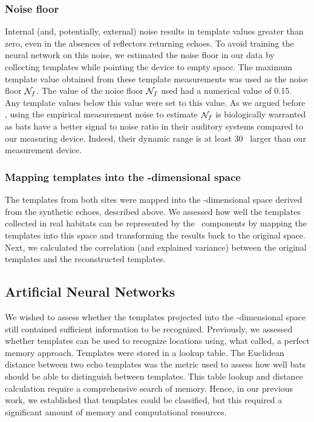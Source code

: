 \documentclass[preprint,5p]{elsarticle}
\begin{document}
\subsubsection{Noise floor}

Internal (and, potentially, external) noise results in template values greater than zero, even in the absences of reflectors returning echoes. To avoid training the neural network on this noise, we estimated the noise floor in our data by collecting templates while pointing the device to empty space. The maximum template value obtained from these template measurements was used as the noise floor $\mathcal{N}_f$. The value of the noise floor $\mathcal{N}_f$ used had a numerical value of 0.15. Any template values below this value were set to this value. As we argued before \citep{Vanderelst2016}, using the empirical measurement noise to estimate $\mathcal{N}_f$ is biologically warranted as bats have a better signal to noise ratio in their auditory systems compared to our measuring device. Indeed, their dynamic range is at least 30 \db\ larger than our measurement device.

\subsubsection{Mapping templates into the \pca-dimensional space}

The templates from both sites were mapped into the \pca-dimensional space derived from the synthetic echoes, described above. We assessed how well the templates collected in real habitats can be represented by the \pca\ components by mapping the templates into this space and transforming the results back to the original space. Next, we calculated the correlation (and explained variance) between the original templates and the reconstructed templates.

\subsection{Artificial Neural Networks}

We wished to assess whether the templates projected into the \pca-dimensional space still contained sufficient information to be recognized. Previously, we assessed whether templates can be used to recognize locations using, what \citet{Baddeley2012} called, a perfect memory approach. Templates were stored in a lookup table. The Euclidean distance between two echo templates was the metric used to assess how well bats should be able to distinguish between templates. This table lookup and distance calculation require a comprehensive search of memory. Hence, in our previous work, we established that templates could be classified, but this required a significant amount of memory and computational resources.
\end{document}
